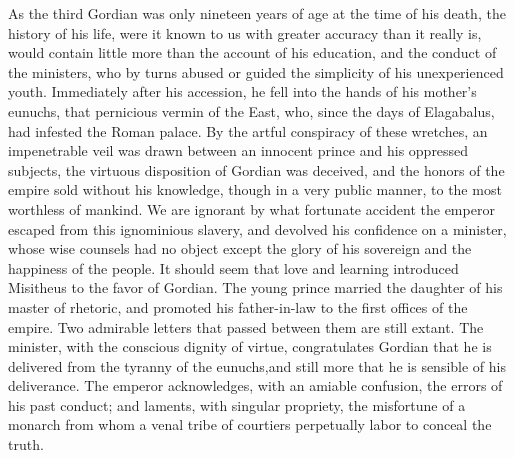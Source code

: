 As the third Gordian was only nineteen years of age at the time
of his death, the history of his life, were it known to us with
greater accuracy than it really is, would contain little more
than the account of his education, and the conduct of the
ministers, who by turns abused or guided the simplicity of his
unexperienced youth. Immediately after his accession, he fell
into the hands of his mother’s eunuchs, that pernicious vermin of
the East, who, since the days of Elagabalus, had infested the
Roman palace. By the artful conspiracy of these wretches, an
impenetrable veil was drawn between an innocent prince and his
oppressed subjects, the virtuous disposition of Gordian was
deceived, and the honors of the empire sold without his
knowledge, though in a very public manner, to the most worthless
of mankind. We are ignorant by what fortunate accident the
emperor escaped from this ignominious slavery, and devolved his
confidence on a minister, whose wise counsels had no object
except the glory of his sovereign and the happiness of the
people. It should seem that love and learning introduced
Misitheus to the favor of Gordian. The young prince married the
daughter of his master of rhetoric, and promoted his
father-in-law to the first offices of the empire. Two admirable
letters that passed between them are still extant. The minister,
with the conscious dignity of virtue, congratulates Gordian that
he is delivered from the tyranny of the eunuchs,\footnotemark[47] and still
more that he is sensible of his deliverance. The emperor
acknowledges, with an amiable confusion, the errors of his past
conduct; and laments, with singular propriety, the misfortune of
a monarch from whom a venal tribe of courtiers perpetually labor
to conceal the truth.\footnotemark[48]



